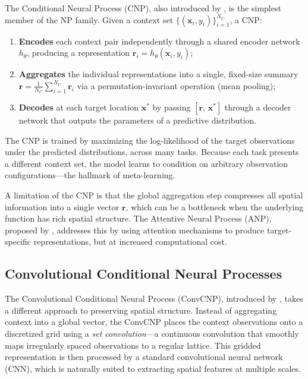 The Conditional Neural Process (CNP), also introduced by \citet{garnelo2018cnp}, is the simplest member of the NP family. Given a context set $\{(\mathbf{x}_i, y_i)\}_{i=1}^{N_C}$, a CNP:
%
\begin{enumerate}
    \item \textbf{Encodes} each context pair independently through a shared encoder network $h_\theta$, producing a representation $\mathbf{r}_i = h_\theta(\mathbf{x}_i, y_i)$;
    \item \textbf{Aggregates} the individual representations into a single, fixed-size summary $\mathbf{r} = \frac{1}{N_C}\sum_{i=1}^{N_C} \mathbf{r}_i$ via a permutation-invariant operation (mean pooling);
    \item \textbf{Decodes} at each target location $\mathbf{x}^*$ by passing $[\mathbf{r},\, \mathbf{x}^*]$ through a decoder network that outputs the parameters of a predictive distribution.
\end{enumerate}
%
The CNP is trained by maximizing the log-likelihood of the target observations under the predicted distributions, across many tasks. Because each task presents a different context set, the model learns to condition on arbitrary observation configurations---the hallmark of meta-learning.

A limitation of the CNP is that the global aggregation step compresses all spatial information into a single vector $\mathbf{r}$, which can be a bottleneck when the underlying function has rich spatial structure. The Attentive Neural Process (ANP), proposed by \citet{kim2019}, addresses this by using attention mechanisms to produce target-specific representations, but at increased computational cost.

\subsection{Convolutional Conditional Neural Processes}

The Convolutional Conditional Neural Process (ConvCNP), introduced by \citet{gordon2019}, takes a different approach to preserving spatial structure. Instead of aggregating context into a global vector, the ConvCNP places the context observations onto a discretized grid using a \textit{set convolution}---a continuous convolution that smoothly maps irregularly spaced observations to a regular lattice. This gridded representation is then processed by a standard convolutional neural network (CNN), which is naturally suited to extracting spatial features at multiple scales.

